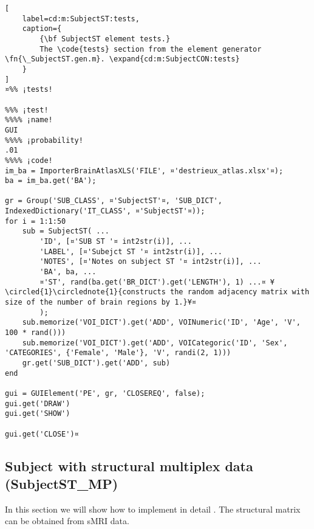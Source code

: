 \documentclass{tufte-handout}
\begin{document}
\begin{lstlisting}[
	label=cd:m:SubjectST:tests,
	caption={
		{\bf SubjectST element tests.}
		The \code{tests} section from the element generator \fn{\_SubjectST.gen.m}. \expand{cd:m:SubjectCON:tests}
	}
]
¤%% ¡tests!

%%% ¡test!
%%%% ¡name!
GUI
%%%% ¡probability!
.01
%%%% ¡code!
im_ba = ImporterBrainAtlasXLS('FILE', ¤'destrieux_atlas.xlsx'¤);
ba = im_ba.get('BA');

gr = Group('SUB_CLASS', ¤'SubjectST'¤, 'SUB_DICT', IndexedDictionary('IT_CLASS', ¤'SubjectST'¤));
for i = 1:1:50
    sub = SubjectST( ...
        'ID', [¤'SUB ST '¤ int2str(i)], ...
        'LABEL', [¤'Subejct ST '¤ int2str(i)], ...
        'NOTES', [¤'Notes on subject ST '¤ int2str(i)], ...
        'BA', ba, ...
        ¤'ST', rand(ba.get('BR_DICT').get('LENGTH'), 1) ...¤ ¥\circled{1}\circlednote{1}{constructs the random adjacency matrix with size of the number of brain regions by 1.}¥¤
        );
    sub.memorize('VOI_DICT').get('ADD', VOINumeric('ID', 'Age', 'V', 100 * rand()))
    sub.memorize('VOI_DICT').get('ADD', VOICategoric('ID', 'Sex', 'CATEGORIES', {'Female', 'Male'}, 'V', randi(2, 1)))
    gr.get('SUB_DICT').get('ADD', sub)
end

gui = GUIElement('PE', gr, 'CLOSEREQ', false);
gui.get('DRAW')
gui.get('SHOW')

gui.get('CLOSE')¤
\end{lstlisting}

\clearpage
\subsection{Subject with structural multiplex data (SubjectST\_MP)}

In this section we will show how to implement in detail . The structural matrix can be obtained from sMRI data.
\end{document}
